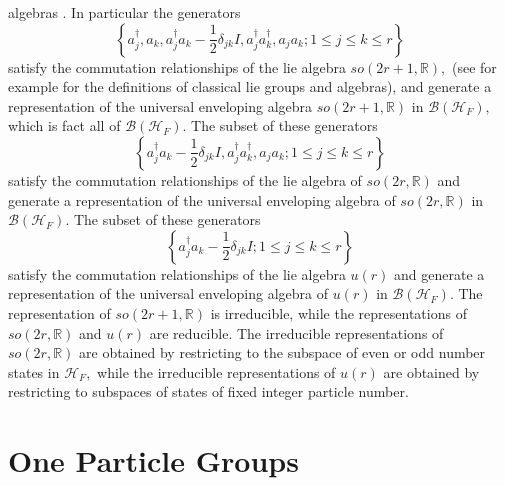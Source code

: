 \documentclass[aps,preprint]{revtex4}%
\begin{document}
algebras \cite{Encyclo}. In particular the generators
\begin{equation}
\left\{  a_{j}^{\dagger},a_{k},a_{j}^{\dagger}a_{k}-\frac{1}{2}\delta
_{jk}I,a_{j}^{\dagger}a_{k}^{\dagger},a_{j}a_{k};1\leq j\leq k\leq r\right\}
\end{equation}
satisfy the commutation relationships of the lie algebra $so\left(
2r+1,\mathbb{R}\right)  ,$ (see \cite{Gilmore_book} for example for the
definitions of classical lie groups and algebras), and generate a
representation of the universal enveloping algebra $so\left(  2r+1,\mathbb{R}%
\right)  $ in $\mathcal{B}\left(  \mathcal{H}_{F}\right)  ,$ which is fact all
of $\mathcal{B}\left(  \mathcal{H}_{F}\right)  .$ The subset of these
generators
\begin{equation}
\left\{  a_{j}^{\dagger}a_{k}-\frac{1}{2}\delta_{jk}I,a_{j}^{\dagger}%
a_{k}^{\dagger},a_{j}a_{k};1\leq j\leq k\leq r\right\}
\end{equation}
satisfy the commutation relationships of the lie algebra of $so\left(
2r,\mathbb{R}\right)  $ and generate a representation of the universal
enveloping algebra of $so\left(  2r,\mathbb{R}\right)  $ in $\mathcal{B}%
\left(  \mathcal{H}_{F}\right)  .$ The subset of these generators
\begin{equation}
\left\{  a_{j}^{\dagger}a_{k}-\frac{1}{2}\delta_{jk}I;1\leq j\leq k\leq
r\right\}
\end{equation}
satisfy the commutation relationships of the lie algebra $u\left(  r\right)  $
and generate a representation of the universal enveloping algebra of $u\left(
r\right)  $ in $\mathcal{B}\left(  \mathcal{H}_{F}\right)  $. The
representation of $so\left(  2r+1,\mathbb{R}\right)  $ is irreducible, while
the representations of $so\left(  2r,\mathbb{R}\right)  $ and $u\left(
r\right)  $ are reducible. The irreducible representations of $so\left(
2r,\mathbb{R}\right)  $ are obtained by restricting to the subspace of even or
odd number states in $\mathcal{H}_{F},$ while the irreducible representations
of $u\left(  r\right)  $ are obtained by restricting to subspaces of states of
fixed integer particle number.

\section{One Particle Groups \label{one particle groups}}
\end{document}

